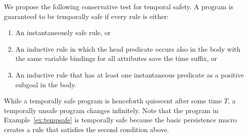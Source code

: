 We propose the following conservative test for temporal safety.  A program is
guaranteed to be temporally safe if every rule is either:

\begin{enumerate}
\item An instantaneously safe rule, or
\item An inductive rule in which the head predicate occurs also in the
body with the same variable bindings for all attributes save the time suffix,
or
\item An inductive rule that has at least one instantaneous predicate as a
positive subgoal in the body.
\end{enumerate}


While a temporally safe program is henceforth quiescent after some time $T$,
a temporally unsafe program changes infinitely.  Note that
the \slang program in Example~\ref{ex:tempsafe} is temporally safe because
the basic persistence macro creates a rule that satisfies the second condition above.

